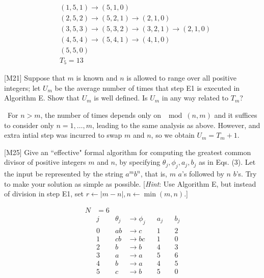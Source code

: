 \documentclass{amsart}
\begin{document}
\begin{solution}
\
\begin{align*}
  &(1,5,1) \to (5,1,0) \\
  &(2,5,2) \to (5,2,1) \to (2,1,0) \\
  &(3,5,3) \to (5,3,2) \to (3,2,1) \to (2,1,0) \\
  &(4,5,4) \to (5,4,1) \to (4,1,0) \\
  &(5,5,0) \\
  &T_5 = 13
\end{align*}
\end{solution}

\begin{problem}{[}M21{]}
  Suppose that \(m\) is known and \(n\) is allowed to range over all positive
  integers; let \(U_m\) be the average number of times that step E1 is executed
  in Algorithm E.  Show that \(U_m\) is well defined.  Is \(U_m\) in any way
  related to \(T_m\)?
\end{problem}

\begin{solution}
\
For \(n > m\), the number of times depends only on \(\mod(n, m)\) and it
suffices to consider only \(n=1,\dots,m\), leading to the same analysis as
above. However, and extra intial step was incurred to swap \(m\) and \(n\),
so we obtain \(U_m = T_m + 1\).
\end{solution}

\begin{problem}{[}M25{]}
  Give an ``effective" formal algorithm for computing the greatest common
  divisor of positive integers \(m\) and \(n\), by specifying
  \(\theta_j, \phi_j, a_j, b_j\) as in Eqs. (3).  Let the input be represented
  by the string \(a^mb^n\), that is, \(m\) \(a\)'s followed by \(n\) \(b\)'s.
  Try to make your solution as simple as possible.  [\emph{Hint}: Use
  Algorithm E, but instead of division in step E1, set
  \(r \gets |m-n|, n \gets \min(m,n)\).]
\end{problem}

\begin{solution}
  \begin{align*}
    N &= 6 \\
    &j & \theta_j &\to \phi_j & &a_j & &b_j \\
    &0 & ab       &\to c      & &1   & &2 \\
    &1 & cb       &\to bc     & &1   & &0 \\
    &2 & b        &\to b      & &4   & &3 \\
    &3 & a        &\to a      & &5   & &6 \\
    &4 & b        &\to a      & &4   & &5 \\
    &5 & c        &\to b      & &5   & &0
  \end{align*}
\end{solution}
\end{document}
